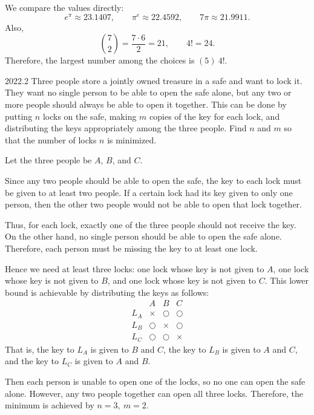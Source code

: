     \begin{solution}
        We compare the values directly:
        \[
            e^\pi \approx 23.1407,
            \qquad
            \pi^e \approx 22.4592,
            \qquad
            7\pi \approx 21.9911.
        \]
        Also,
        \[
            \binom{7}{2}
            =
            \frac{7\cdot 6}{2}
            =
            21,
            \qquad
            4!
            =
            24.
        \]
        Therefore, the largest number among the choices is $\boxed{(5)\ 4!}$.
    \end{solution}

    \begin{pastproblem}{2022.2}
        Three people store a jointly owned treasure in a safe and want to lock it. They want no
        single person to be able to open the safe alone, but any two or more people should always be
        able to open it together. This can be done by putting $n$ locks on the safe, making $m$
        copies of the key for each lock, and distributing the keys appropriately among the three
        people. Find $n$ and $m$ so that the number of locks $n$ is minimized.
    \end{pastproblem}

    \begin{solution}
        Let the three people be $A$, $B$, and $C$.

        Since any two people should be able to open the safe, the key to each lock must be given to
        at least two people. If a certain lock had its key given to only one person, then the other
        two people would not be able to open that lock together.

        Thus, for each lock, exactly one of the three people should not receive the key. On the
        other hand, no single person should be able to open the safe alone. Therefore, each person
        must be missing the key to at least one lock.

        Hence we need at least three locks: one lock whose key is not given to $A$, one lock whose
        key is not given to $B$, and one lock whose key is not given to $C$. This lower bound is
        achievable by distributing the keys as follows:
        \[
            \begin{array}{c|ccc}
                & A & B & C \\
                \hline
                L_A & \times & \bigcirc & \bigcirc \\
                L_B & \bigcirc & \times & \bigcirc \\
                L_C & \bigcirc & \bigcirc & \times
            \end{array}
        \]
        That is, the key to $L_A$ is given to $B$ and $C$, the key to $L_B$ is given to $A$ and $C$,
        and the key to $L_C$ is given to $A$ and $B$.

        Then each person is unable to open one of the locks, so no one can open the safe alone.
        However, any two people together can open all three locks. Therefore, the minimum is
        achieved by $\boxed{n=3,\ m=2}$.
    \end{solution}

